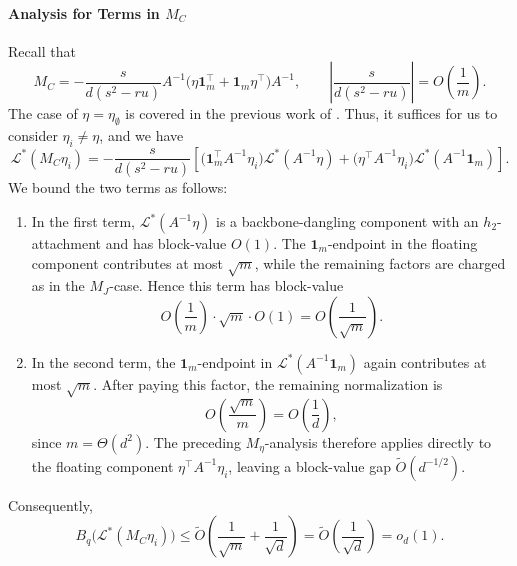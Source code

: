 \documentclass[12pt]{article}
\def\1{\bm{1}}
\newcommand{\calL}{\mathcal{L}}
\begin{document}
\paragraph{Analysis for Terms in $M_C$}

Recall that
\[
    M_C
    =
    -\frac{s}{d(s^2-ru)}
    A^{-1}
    \bigl(\eta\1_m^\top+\1_m\eta^\top\bigr)
    A^{-1},
    \qquad
    \left|\frac{s}{d(s^2-ru)}\right|
    =
    O\left(\frac1m\right).
\]
The case of $\eta = \eta_\emptyset$ is covered in the previous work of \cite{HKPX23}.
Thus, it suffices for us to consider \(\eta_i\neq\eta\), and we have
\[
    \calL^*(M_C\eta_i)
    =
    -\frac{s}{d(s^2-ru)}
    \left[
        \bigl(\1_m^\top A^{-1}\eta_i\bigr)
        \calL^*(A^{-1}\eta)
        +
        \bigl(\eta^\top A^{-1}\eta_i\bigr)
        \calL^*(A^{-1}\1_m)
    \right].
\]
We bound the two terms as follows:
\begin{enumerate}
    \item
    In the first term, \(\calL^*(A^{-1}\eta)\) is a
    backbone-dangling component with an \(h_2\)-attachment and has
    block-value \(O(1)\). The \(\1_m\)-endpoint in the floating
    component contributes at most \(\sqrt m\), while the remaining
    factors are charged as in the \(M_J\)-case. Hence this term has
    block-value
    \[
        O\left(\frac1m\right)\cdot\sqrt m\cdot O(1)
        =
        O\left(\frac1{\sqrt m}\right).
    \]

    \item
    In the second term, the \(\1_m\)-endpoint in
    \(\calL^*(A^{-1}\1_m)\) again contributes at most \(\sqrt m\).
    After paying this factor, the remaining normalization is
    \[
        O\left(\frac{\sqrt m}{m}\right)
        =
        O\left(\frac1d\right),
    \]
    since \(m=\Theta(d^2)\). The preceding \(M_\eta\)-analysis therefore
    applies directly to the floating component
    \(\eta^\top A^{-1}\eta_i\), leaving a block-value gap
    \(\widetilde O(d^{-1/2})\).
\end{enumerate}
Consequently,
\[
    B_q\bigl(\calL^*(M_C\eta_i)\bigr)
    \leq
    \widetilde O\left(
        \frac1{\sqrt m}+\frac1{\sqrt d}
    \right)
    =
    \widetilde O\left(\frac1{\sqrt d}\right)
    =
    o_d(1).
\]



%
\end{document}
